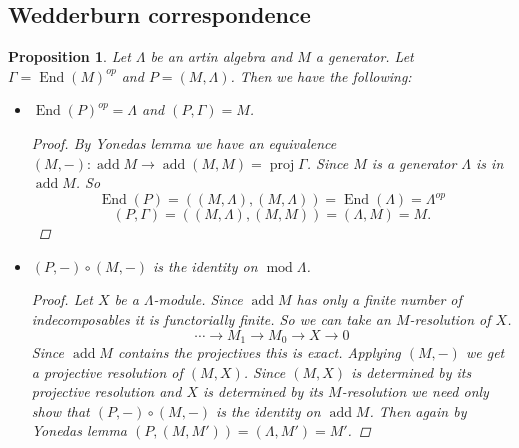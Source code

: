 \documentclass[11pt, a4paper, english]{article}
\newtheorem{prop}[theorem]{Proposition}
\theoremstyle{definition}
\DeclareMathOperator{\End}{End}
\DeclareMathOperator{\proj}{proj}
\DeclareMathOperator{\add}{add}
\def\mod{\operatorname{mod}}
\begin{document}
\subsection{Wedderburn correspondence}\label{sec:wedderburn_correspondence}
\begin{prop} \label{prop:hom_generator_equivalence}
Let $\Lambda$ be an artin algebra and $M$ a generator. Let $\Gamma = \End(M)^{op}$ and $P=(M, \Lambda)$. Then we have the following:
\begin{itemize}
	\item $\End(P)^{op} = \Lambda$ and $(P, \Gamma) = M$.

\begin{proof}
	By Yonedas lemma we have an equivalence $(M,-):\add M \to \add (M,M)=\proj\Gamma$. Since $M$ is a generator $\Lambda$ is in $\add M$. So $$\End(P)=((M,\Lambda), (M,\Lambda)) = \End(\Lambda)=\Lambda^{op}$$  $$(P,\Gamma)=((M,\Lambda),(M,M))=(\Lambda,M)=M.$$
\end{proof}

\item $(P,-)\circ (M,-)$ is the identity on $\mod\Lambda$.

\begin{proof}
	Let $X$ be a $\Lambda$-module. Since $\add M$ has only a finite number of indecomposables it is functorially finite. So we can take an $M$-resolution of $X$.
	$$\cdots \to M_1 \to M_0 \to X \to 0$$
	Since $\add M$ contains the projectives this is exact. Applying $(M,-)$ we get a projective resolution of $(M,X)$. Since $(M, X)$ is determined by its projective resolution and $X$ is determined by its $M$-resolution we need only show that $(P,-)\circ (M,-)$ is the identity on $\add M$. Then again by Yonedas lemma $(P, (M, M')) = (\Lambda, M')=M'$.
\end{proof}
\end{itemize}
\end{prop}
\end{document}
